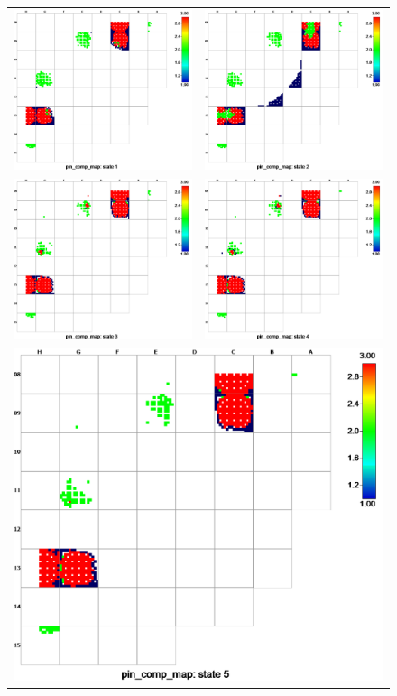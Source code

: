 \documentclass[edeposit,fullpage,11pt]{uiucthesis2009}
\begin{document}
\begin{center}
\begin{figure}[h]
\begin{tabular}{lr}
\includegraphics[trim={0 0 4.5cm 0},clip,width=0.4\linewidth]{./Figures/screening/comp1.png} & \includegraphics[trim={0 0 4.5cm 0},clip,width=0.4\linewidth]{./Figures/screening/comp2.png} \\
\includegraphics[trim={0 0 4.5cm 0},clip,width=0.4\linewidth]{./Figures/screening/comp3.png} & \includegraphics[trim={0 0 4.5cm 0},clip,width=0.4\linewidth]{./Figures/screening/comp4.png} \\
\multicolumn{2}{c}{\includegraphics[trim={0 0 4.5cm 0},clip,width=0.4\linewidth]{./Figures/screening/comp5.png}} \\

\end{tabular}
\end{figure}
\end{center}
\end{document}
